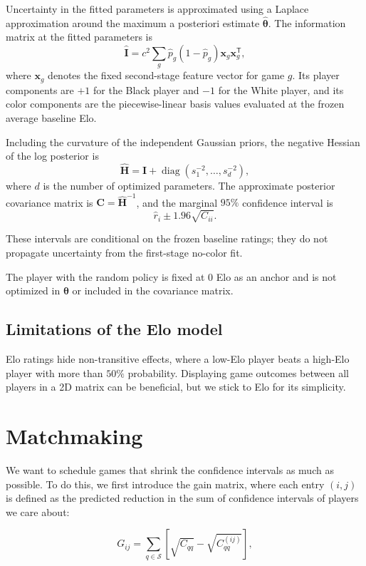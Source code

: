 \documentclass{article}
\begin{document}
Uncertainty in the fitted parameters is approximated using a Laplace
approximation \citep{tierney1986accurate} around the maximum a posteriori estimate
\(\widehat{\boldsymbol{\theta}}\). The information matrix at the fitted
parameters is
\[
\widehat{\boldsymbol{I}}
=
c^2\sum_g
\widehat{p}_g(1-\widehat{p}_g)
\boldsymbol{x}_g\boldsymbol{x}_g^\mathsf{T},
\]
where \(\boldsymbol{x}_g\) denotes the fixed second-stage feature vector for
game \(g\). Its player components are \(+1\) for the Black player and \(-1\)
for the White player, and its color components are the piecewise-linear basis
values evaluated at the frozen average baseline Elo.


Including the curvature of the independent Gaussian priors, the negative
Hessian of the log posterior is
\[
\widehat{\boldsymbol{H}}
=
\widehat{\boldsymbol{I}}
+
\operatorname{diag}(s_1^{-2},\ldots,s_d^{-2}),
\]
where \(d\) is the number of optimized parameters. The approximate posterior
covariance matrix is \(\boldsymbol{C}=\widehat{\boldsymbol{H}}^{-1}\), and the
marginal \(95\%\) confidence interval is
\[
\widehat{r}_i
\pm
1.96\sqrt{C_{ii}}.
\]

These intervals are conditional on the frozen baseline ratings; they do not
propagate uncertainty from the first-stage no-color fit.

The player with the random policy is fixed at 0 Elo as an anchor and is not
optimized in $\boldsymbol{\theta}$ or included in the covariance matrix.

\subsection{Limitations of the Elo model}
Elo ratings hide non-transitive effects, where a low-Elo player beats a high-Elo player with more than $50\%$ probability.
Displaying game outcomes between all players in a 2D matrix can be beneficial, but we stick to Elo for its simplicity.


\section{Matchmaking}
We want to schedule games that shrink the confidence intervals as much as possible.
To do this, we first introduce the gain matrix, where each entry $(i,j)$ is defined as the predicted reduction in the sum of confidence intervals of players we care about:

\[
G_{ij}
=
\sum_{q\in\mathcal{S}}
\left[
\sqrt{C_{qq}}
-
\sqrt{C^{(ij)}_{qq}}
\right],
\]
\end{document}

